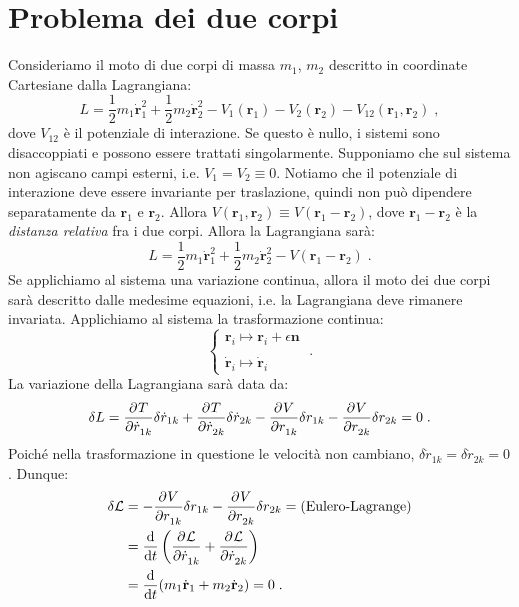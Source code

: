 \section{Problema dei due corpi}
Consideriamo il moto di due corpi di massa $m_1$, $m_2$ descritto in coordinate Cartesiane dalla Lagrangiana:
\begin{equation}
L=\frac{1}{2}m_1\dot{\mathbf{r}}_1^2+\frac{1}{2}m_2\dot{\mathbf{r}}_2^2-V_1(\mathbf{r}_1)-V_2(\mathbf{r}_2)-V_{12}(\mathbf{r}_1,\mathbf{r}_2)\;,
\end{equation}
dove $V_{12}$ è il potenziale di interazione. Se questo è nullo, i sistemi sono disaccoppiati e possono essere trattati singolarmente. Supponiamo che sul sistema non agiscano campi esterni, i.e. $V_1=V_2\equiv 0$. Notiamo che il potenziale di interazione deve essere invariante per traslazione, quindi non può dipendere separatamente da $\mathbf{r}_1$ e $\mathbf{r}_2$. Allora $V(\mathbf{r}_1,\mathbf{r}_2)\equiv V(\mathbf{r}_1-\mathbf{r}_2)$, dove $\mathbf{r}_1-\mathbf{r}_2$ è la \textit{distanza relativa} fra i due corpi. Allora la Lagrangiana sarà:
\begin{equation}
L=\frac{1}{2}m_1\dot{\mathbf{r}}_1^2+\frac{1}{2}m_2\dot{\mathbf{r}}_2^2-V(\mathbf{r}_1-\mathbf{r}_2)\;.
\end{equation}
Se applichiamo al sistema una variazione continua, allora il moto dei due corpi sarà descritto dalle medesime equazioni, i.e. la Lagrangiana deve rimanere invariata. Applichiamo al sistema la trasformazione continua:
\begin{equation}
\begin{cases}
\mathbf{r}_i\longmapsto\mathbf{r}_i+\epsilon\mathbf{n}\\
\\
\dot{\mathbf{r}}_i\longmapsto\dot{\mathbf{r}}_i
\end{cases}\;.
\end{equation}
La variazione della Lagrangiana sarà data da:
\begin{equation*}
\delta L=\pdev{T}{\dot{r}_{1k}}\delta\dot{r}_{1k}+\pdev{T}{\dot{r}_{2k}}\delta\dot{r}_{2k}-\pdev{V}{r_{1k}}\delta r_{1k}-\pdev{V}{r_{2k}}\delta r_{2k}=0\;.
\end{equation*}
Poiché nella trasformazione in questione le velocità non cambiano, $\delta\dot{r}_{1k}=\delta\dot{r}_{2k}=0$. Dunque:
\begin{align*}
\delta\lag&=-\pdev{V}{r_{1k}}\delta r_{1k}-\pdev{V}{r_{2k}}\delta r_{2k}=\mbox{(Eulero-Lagrange)} \\
&=\frac{\diff}{\diff[t]}\left(\pdev{\lag}{\dot{r}_{1k}}+\pdev{\lag}{\dot{r}_{2k}}\right) \\
&=\frac{\diff}{\diff[t]}(m_1\dot{\mathbf{r}}_1+m_2\dot{\mathbf{r}}_2)=0\;.
\end{align*}
